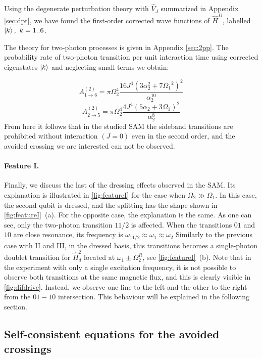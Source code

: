 \documentclass[%
 aip,
 amsmath,amssymb,
 reprint,%
]{revtex4-1}
\begin{document}
Using the degenerate perturbation theory with $\hat V_J$ summarized in Appendix \ref{sec:dpt}, we have found the first-order corrected wave functions of $\hat H^D$, labelled $\ket{k},\ k=1..6$. 

The theory for two-photon processes is given in Appendix \ref{sec:2pp}. The probability rate of two-photon transition per unit interaction time using corrected eigenstates $\ket{k}$ and neglecting small terms we obtain:

\begin{equation}
A^{(2)}_{1\rightarrow 6} =\pi\Omega_2^4 \frac{16 J^4 \left(3 \alpha_2 ^2+7 \text{$\Omega_1
		$}^2\right)^2}{\alpha_2 ^{10}}
\end{equation}
\begin{equation}
A^{(2)}_{2\rightarrow 5} =\pi\Omega_2^4 \frac{4 J^4 (5 \alpha_2 +3 \text{$\Omega_1$})^2}{\alpha_2 ^8}
\end{equation}
From here it follows that in the studied SAM the sideband transitions are prohibited without interaction $(J=0)$ even in the second order, and the avoided crossing we are interested can not be observed.

\paragraph{Feature I.} Finally, we discuss the last of the dressing effects observed in the SAM. Its explanation is illustrated in \autoref{fig:featureI} for the case when $\Omega_2 \gg \Omega_1$. In this case, the second qubit is dressed, and the splitting has the shape shown in \autoref{fig:featureI}~(a). For the opposite case, the explanation is the same. As one can see, only the two-photon transition $11/2$ is affected. When the transitions $01$ and $10$ are close resonance, its frequency is $\omega_{11/2} \approx \omega_1 \approx \omega_2$ Similarly to the previous case with II and III, in the dressed basis, this transitions becomes a single-photon doublet transition for $\hat H_d^2$ located at $\omega_1 \pm \Omega_2^R$, see \autoref{fig:featureI}~(b). Note that in the experiment with only a single excitation frequency, it is not possible to observe both transitions at the same magnetic flux, and this is clearly visible in \autoref{fig:difdrive}. Instead, we observe one line to the left and the other to the right from the $01-10$ intersection. This behaviour will be explained in the following section.




\subsection{Self-consistent equations for the avoided crossings}
\label{sec:münchhausen}
\end{document}
